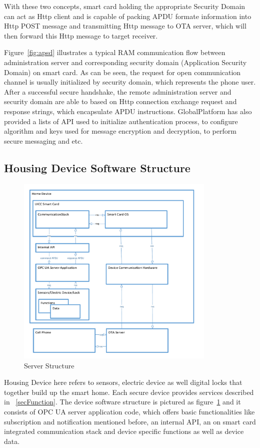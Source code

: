 With these two concepts, smart card holding the appropriate Security Domain can act as Http client and is capable of packing APDU formate information into Http POST message and transmitting Http message to OTA server, which will then forward this Http message to target receiver.\cite{ramGP}
 
Figure~\ref{fig:apsd} illustrates a typical RAM communication flow between administration server and corresponding security domain (Application Security Domain) on smart card. As can be seen, the request for open communication channel is usually initialized by security domain, which represents the phone user. After a successful secure handshake, the remote administration server and security domain are able to based on Http connection exchange request and response strings, which encapsulate APDU instructions. GlobalPlatform has also provided  a lists of API used to initialize authentication process, to configure algorithm and keys used for message encryption and decryption, to perform secure messaging and etc.

\subsection{Housing Device Software Structure}

\begin{figure}[!htb]
	\centering
	\includegraphics[width=0.85\textwidth]{serverStructure}
		\caption{Server Structure}
	\label{fig:serverStructure}
\end{figure}
Housing Device here refers to sensors, electric device as well digital locks that together build up the smart home. Each secure device provides services described in ~\ref{secFunction}. The device software structure is pictured as figure~\ref{fig:serverStructure} and it consists of OPC UA server application code, which offers basic functionalities like subscription and notification mentioned before, an internal API, an on smart card integrated communication stack and device specific functions as well as device data.

